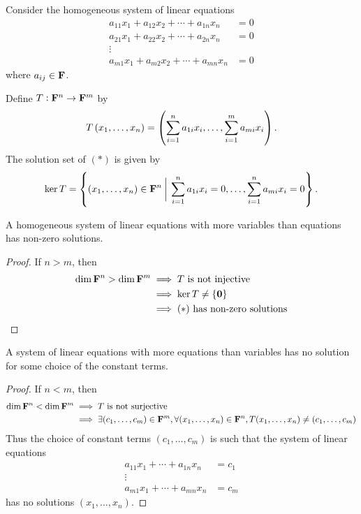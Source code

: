 \begin{example}
Consider the homogeneous system of linear equations
\begin{equation*}\tag{$\ast$}
\begin{split}
a_{11}x_1+a_{12}x_2+\cdots+a_{1n}x_n&=0\\
a_{21}x_1+a_{22}x_2+\cdots+a_{2n}x_n&=0\\
\vdots&\\
a_{m1}x_1+a_{m2}x_2+\cdots+a_{mn}x_n&=0
\end{split}
\end{equation*}
where $a_{ij}\in\mathbf F$.

Define $T:\mathbf F^n\to\mathbf F^m$ by
\[T\left(x_1,\dots,x_n\right)=\left(\sum_{i=1}^{n}a_{1i}x_i,\dots,\sum_{i=1}^{m}a_{mi}x_i\right).\]
The solution set of $(\ast)$ is given by
\[\ker T=\left\{(x_1,\dots,x_n)\in\mathbf F^n\:\bigg|\:\sum_{i=1}^{n}a_{1i}x_i=0,\dots,\sum_{i=1}^{n}a_{mi}x_i=0\right\}.\]

\begin{proposition*}
A homogeneous system of linear equations with more variables than equations has non-zero solutions.
\end{proposition*}

\begin{proof}
If $n>m$, then
\begin{align*}
\dim\mathbf F^n>\dim\mathbf F^m&\implies T\text{ is not injective}\\
&\implies\ker T\neq\{\vb{0}\}\\
&\implies(\ast)\text{ has non-zero solutions}
\end{align*}
\end{proof}

\begin{proposition*}
A system of linear equations with more equations than variables has no solution for some choice of the constant terms.
\end{proposition*}

\begin{proof}
If $n<m$, then
\begin{align*}
\dim\mathbf F^n<\dim\mathbf F^m&\implies T\text{ is not surjective}\\
&\implies\exists(c_1,\dots,c_m)\in\mathbf F^m, \forall(x_1,\dots,x_n)\in\mathbf F^n, T(x_1,\dots,x_n)\neq(c_1,\dots,c_m)
\end{align*}
Thus the choice of constant terms $(c_1,\dots,c_m)$ is such that the system of linear equations
\begin{align*}
a_{11}x_1+\cdots+a_{1n}x_n&=c_1\\
\vdots&\\
a_{m1}x_1+\cdots+a_{mn}x_n&=c_m
\end{align*}
has no solutions $(x_1,\dots,x_n)$.
\end{proof}
\end{example}
\pagebreak


